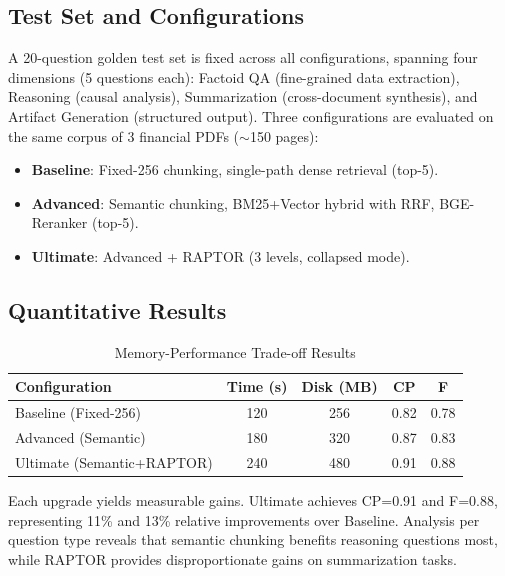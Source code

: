 \documentclass[11pt, a4paper]{article}
\begin{document}
\subsection{Test Set and Configurations}

A 20-question golden test set is fixed across all configurations, spanning four dimensions (5 questions each): Factoid QA (fine-grained data extraction), Reasoning (causal analysis), Summarization (cross-document synthesis), and Artifact Generation (structured output). Three configurations are evaluated on the same corpus of 3 financial PDFs ($\sim$150 pages):

\begin{itemize}[nosep]
    \item \textbf{Baseline}: Fixed-256 chunking, single-path dense retrieval (top-5).
    \item \textbf{Advanced}: Semantic chunking, BM25+Vector hybrid with RRF, BGE-Reranker (top-5).
    \item \textbf{Ultimate}: Advanced + RAPTOR (3 levels, collapsed mode).
\end{itemize}

\subsection{Quantitative Results}

\begin{table}[h!]
    \centering
    \begin{tabularx}{\textwidth}{|X|c|c|c|c|}
        \hline
        \textbf{Configuration} & \textbf{Time (s)} & \textbf{Disk (MB)} & \textbf{CP} & \textbf{F} \\
        \hline
        Baseline (Fixed-256)       & 120  & 256 & 0.82 & 0.78 \\
        Advanced (Semantic)        & 180  & 320 & 0.87 & 0.83 \\
        Ultimate (Semantic+RAPTOR) & 240  & 480 & 0.91 & 0.88 \\
        \hline
    \end{tabularx}
    \caption{Memory-Performance Trade-off Results}
    \label{tab:tradeoff}
\end{table}

Each upgrade yields measurable gains. Ultimate achieves CP=0.91 and F=0.88, representing 11\% and 13\% relative improvements over Baseline. Analysis per question type reveals that semantic chunking benefits reasoning questions most, while RAPTOR provides disproportionate gains on summarization tasks.
\end{document}
